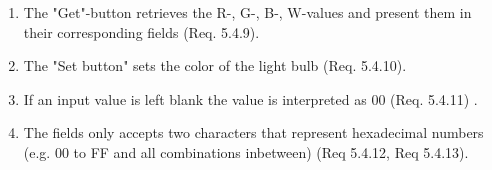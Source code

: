\documentclass[a4paper]{article}
\newlength{\testlabellength}
\newenvironment{testlist}{\begin{enumerate}[label=\bfseries Instruction \thesubsection.\arabic* , labelindent=0pt, labelwidth=\testlabellength , leftmargin=2cm]}{\end{enumerate}}
\newenvironment{precondition}{
{\color{white}BLARG}\\ 
\textbf{Precondition}
\begin{itemize}[labelindent=0cm, labelwidth=2cm , leftmargin=1cm]
}
{\end{itemize}}
\newenvironment{instruction}{
\textbf{Instructions:}
\begin{enumerate}[label=\bfseries  \arabic*., labelindent=0cm, labelwidth=2cm , leftmargin=1cm]
}
{\end{enumerate}}
\newenvironment{postcondition}{
\textbf{Postcondition:}
\begin{itemize}[labelindent=0cm, labelwidth=2cm , leftmargin=1cm]
}
{\end{itemize}}
\begin{document}
\begin{appendices}
\begin{testlist}
	\item The "Get"-button retrieves the R-, G-, B-, W-values and present them in their corresponding fields (Req. 5.4.9). 

	\item The "Set button" sets the color of the light bulb (Req. 5.4.10).

	\item If an input value is left blank the value is interpreted as 00 (Req. 5.4.11) .   

    \item The fields only accepts two characters that represent hexadecimal numbers (e.g. 00 to FF and all combinations inbetween) (Req 5.4.12, Req 5.4.13).


\end{testlist}
\end{appendices}
\end{document}
